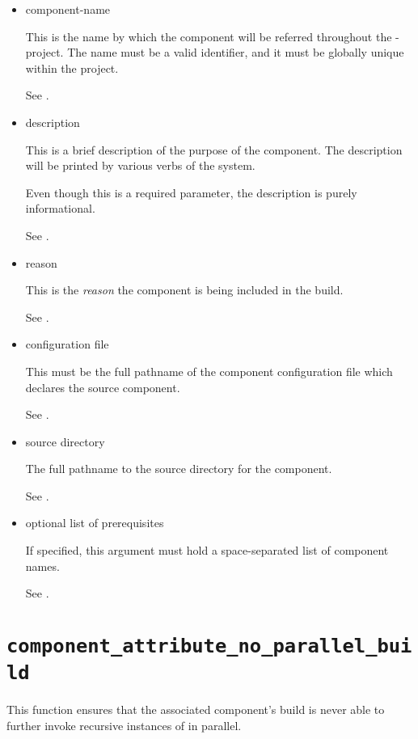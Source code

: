 \begin{itemize}
\item{component-name}

  This is the name by which the component will be referred throughout
  the \lmsbw-project.  The name must be a valid \make identifier, and
  it must be globally unique within the project.

  See .

\item{description}

  This is a brief description of the purpose of the component.  The
  description will be printed by various verbs of the \lmsbw system.

  Even though this is a required parameter, the description is purely
  informational.

  See .

\item{reason}

  This is the \emph{reason} the component is being included in the
  build.

  See .

\item{configuration file}

  This must be the full pathname of the component configuration file
  which declares the source component.

  See .

\item{source directory}

  The full pathname to the source directory for the component.

  See .

\item{optional list of prerequisites}

  If specified, this argument must hold a space-separated list of
  component names.

  See .

\end{itemize}

\section{\texttt{component\_attribute\_no\_parallel\_build}}\label{api:no-parallel}

This function ensures that the associated component's build is never
able to further invoke recursive instances of \make in parallel.

